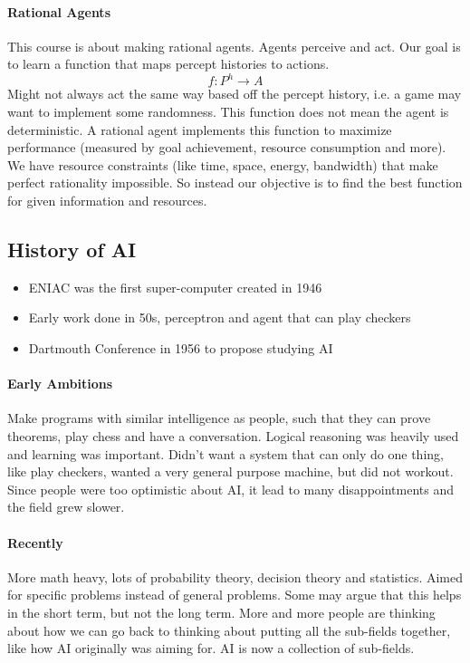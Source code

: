 \documentclass[12 pt]{article}
\begin{document}
        \paragraph{Rational Agents}
            This course is about making rational agents. Agents
            perceive and act. Our goal is to learn a function that
            maps percept histories to actions. $$f:P^h \to A$$
            Might not always act the same way based off the percept
            history, i.e. a game may want to implement some
            randomness. This function does not mean the agent is
            deterministic. A rational agent implements this function
            to maximize performance (measured by goal achievement,
            resource consumption and more).
            \\ We have resource constraints (like time, space, energy,
            bandwidth) that make perfect rationality impossible. So
            instead our objective is to find the best function for
            given information and resources.
        \subsection{History of AI}
        \begin{itemize}
        \item ENIAC was the first super-computer created in 1946
        \item Early work done in 50s, perceptron and agent that can
          play checkers
        \item Dartmouth Conference in 1956 to propose studying AI
        \end{itemize}
            \paragraph{Early Ambitions}
                Make programs with similar intelligence as people,
                such that they can prove theorems, play chess and have
                a conversation. Logical reasoning was heavily used and
                learning was important. Didn't want a system that can
                only do one thing, like play checkers, wanted a very
                general purpose machine, but did not workout. Since
                people were too optimistic about AI, it lead to many
                disappointments and the field grew slower.
            \paragraph{Recently}
                More math heavy, lots of probability theory, decision
                theory and statistics. Aimed for specific problems
                instead of general problems. Some may argue that this
                helps in the short term, but not the long term. More
                and more people are thinking about how we can go back
                to thinking about putting all the sub-fields together,
                like how AI originally was aiming for. AI is
                now a collection of sub-fields.
\end{document}
